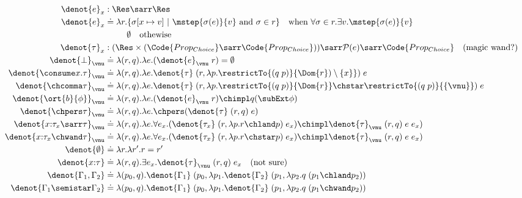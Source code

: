 \begin{align*}
  \denot{e}_x &: \Res \sarr \Res
  \\\denot{e}_x &\doteq \lambda r. \{\sigma[x\mapsto v] ~|~  \mstep{\sigma(e)}{v} \text{ and } \sigma \in r \} \quad \text{when } \forall \sigma \in r.\exists v. \mstep{\sigma(e)}{v}
  \\&\qquad\;\; \emptyset \quad \text{othewise }
  \\\denot{\tau}_x &: (\Res \times (\Code{Prop_{Choice}} \sarr \Code{Prop_{Choice}})) \sarr \mathcal{P}(e) \sarr \Code{Prop_{Choice}} \quad \text{(magic wand?)}
  \\\denot{\bot}_\vnu &\doteq \lambda (r,q). \lambda e. (\denot{e}_\vnu\;r) = \emptyset
  \\\denot{\consume x. \tau}_\vnu &\doteq \lambda (r,q). \lambda e. \denot{\tau}\;(r, \lambda p. \restrictTo{(q\;p)}{\Dom{r}) \setminus \{x\}})\;e
  \\\denot{\chcomma \tau}_\vnu &\doteq \lambda (r,q). \lambda e. \denot{\tau}\;(r, \lambda p. \restrictTo{(q\;p)}{\Dom{r}} \chstar \restrictTo{(q\;p)}{\{\vnu\}} )\;e
  \\\denot{\ort{b}{\phi}}_\vnu &\doteq \lambda (r,q).\lambda e. (\denot{e}_\vnu\;r) \chimpl q (\subExt\phi)
  \\\denot{\chpers \tau}_\vnu &\doteq \lambda (r,q). \lambda e. \chpers (\denot{\tau}\;(r,q)\;e)
  \\\denot{x{:}\tau_x \sarr \tau}_\vnu &\doteq \lambda (r,q).\lambda e.\forall e_x. (\denot{\tau_x}\;(r,\lambda p.r \chland p)\;e_x) \chimpl \denot{\tau}_\vnu\;(r,q)\;e\;e_x)
  \\\denot{x{:}\tau_x \chwand \tau}_\vnu &\doteq \lambda (r,q).\lambda e.\forall e_x. (\denot{\tau_x}\;(r,\lambda p.r \chstar p)\;e_x) \chimpl \denot{\tau}_\vnu\;(r,q)\;e\;e_x)
  \\\denot{\emptyset} &\doteq \lambda r.\lambda r'. r = r'
  \\\denot{x{:}\tau} &\doteq \lambda (r, q). \exists e_x.\denot{\tau}_\vnu\;(r,q)\;e_x \quad \text{(not sure)}
  \\\denot{\Gamma_1, \Gamma_2} &\doteq \lambda (p_0, q).\denot{\Gamma_1}\;(p_0, \lambda p_1.\denot{\Gamma_2}\;(p_1, \lambda p_2. q\;(p_1 \chland p_2)) 
  \\\denot{\Gamma_1 \semistar \Gamma_2} &\doteq \lambda (p_0, q).\denot{\Gamma_1}\;(p_0, \lambda p_1.\denot{\Gamma_2}\;(p_1, \lambda p_2. q\;(p_1 \chwand p_2)) 
\end{align*}\noindent

